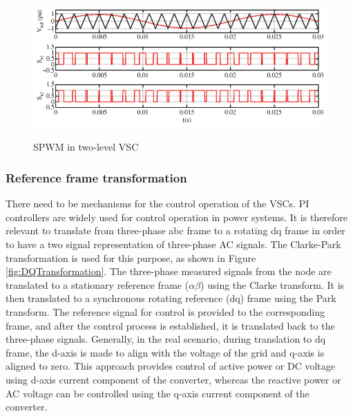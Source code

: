 \begin{figure}[H]
\centering
    \includegraphics[height = 5.5cm,width = 13.5cm]{Diagrams/Chapter_2/2levelVSC_switching.PNG}
    \caption{SPWM in two-level VSC \cite{noauthor_appendix_2014-1}}
    \label{fig:2levelVSC_switching}
\end{figure}

\subsubsection{Reference frame transformation}\label{ref_frame_trafo}
There need to be mechanisms for the control operation of the \gls{VSC}s. \gls{PI} controllers are widely used for control operation in power systems. It is therefore relevant to translate from three-phase abc frame to a rotating dq frame in order to have a two signal representation of three-phase \gls{AC} signals. The Clarke-Park transformation is used for this purpose, as shown in Figure \ref{fig:DQTransformation}. The three-phase measured signals from the node are translated to a stationary reference frame ($\alpha \beta$) using the Clarke transform. It is then translated to a synchronous rotating reference (dq) frame using the Park transform. The reference signal for control is provided to the corresponding frame, and after the control process is established, it is translated back to the three-phase signals. Generally, in the real scenario, during translation to dq frame, the d-axis is made to align with the voltage of the grid and q-axis is aligned to zero. This approach provides control of active power or \gls{DC} voltage using d-axis current component of the converter, whereas the reactive power or \gls{AC} voltage can be controlled using the q-axis current component of the converter.   

